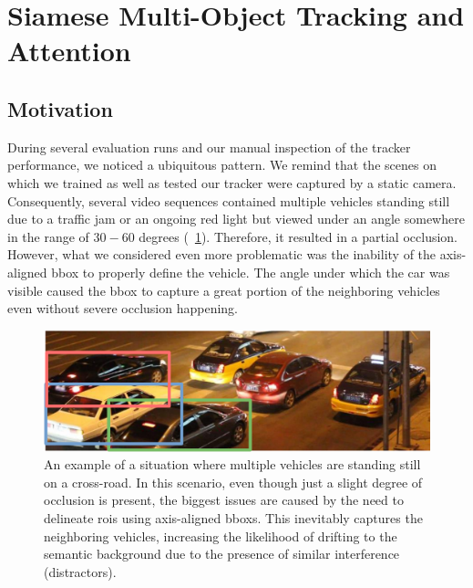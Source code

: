 \section{Siamese Multi-Object Tracking and Attention}
\label{sec:SiamMOTandAttention}

\subsection{Motivation}

During several evaluation runs and our manual inspection of the tracker performance, we noticed a ubiquitous pattern. We remind that the scenes on which we trained as well as tested our tracker were captured by a static camera. Consequently, several video sequences contained multiple vehicles standing still due to a traffic jam or an ongoing red light but viewed under an angle somewhere in the range of $30-60$ degrees (\figtext{}~\ref{fig:UADETRACPartialOcclusion}). Therefore, it resulted in a partial occlusion. However, what we considered even more problematic was the inability of the axis-aligned \gls{bbox} to properly define the vehicle. The angle under which the car was visible caused the \gls{bbox} to capture a great portion of the neighboring vehicles even without severe occlusion happening.

\begin{figure}[!t]
  \centerline{\includegraphics[width=0.7\linewidth]{figures/siamese_tracking/uadetrac_partial_occlusion_red_light.pdf}}
  \caption[Partial occlusion in the \uadetrac{} dataset]{An example of a situation where multiple vehicles are standing still on a cross-road. In this scenario, even though just a slight degree of occlusion is present, the biggest issues are caused by the need to delineate \glspl{roi} using axis-aligned \glspl{bbox}. This inevitably captures the neighboring vehicles, increasing the likelihood of drifting to the semantic background due to the presence of similar interference (distractors).}
  \label{fig:UADETRACPartialOcclusion}
\end{figure}

